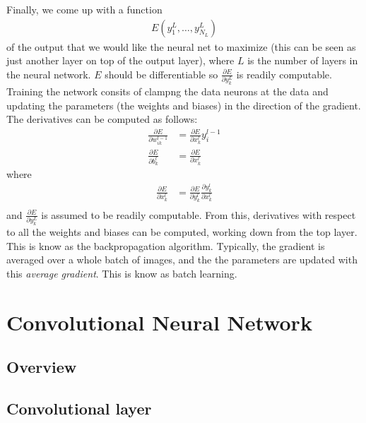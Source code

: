 Finally, we come up with a function 
\begin{align*}
	E\left(y^L_1, \dots, y^L_{N_L}\right)
\end{align*}
of the output that we would like the neural net to maximize (this can be seen as just another layer on top of the output layer), where $L$ is the number of layers in the neural network. $E$ should be differentiable so $\displaystyle\frac{\partial E}{ \partial y^L_k}$ is readily computable. Training the network consits of clampng the data neurons at the data and updating the parameters (the weights and biases) in the direction of the gradient. The derivatives can be computed as follows:
\begin{align*}
\frac{\partial E}{\partial w_{ik}^{l-1}} &= \frac{\partial E}{\partial x^l_k}y^{l-1}_i\\
\frac{\partial E}{\partial b^l_k} &= \frac{\partial E}{\partial x^l_k} 
\end{align*}
where
\begin{align*}
\frac{\partial E}{\partial x^l_k} &= \frac{\partial E}{\partial y^l_k} \frac{\partial y^l_k}{\partial x^l_k}\\
\end{align*}
and $\displaystyle\frac{\partial E}{\partial y^L_k}$ is assumed to be readily computable. From this, derivatives with respect to all the weights and biases can be computed, working down from the top layer. This is know as the backpropagation algorithm. Typically, the gradient is averaged over a whole batch of images, and the the parameters are updated with this \textit{average gradient}. This is know as batch learning.

\section{Convolutional Neural Network}
\subsection{Overview}

\subsection{Convolutional layer}

